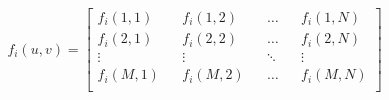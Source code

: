 \documentclass[../main.tex]{subfiles}%
\begin{document}
%
    \Xequation%
    \begin{equation}%
        f_{i}(u,v) =%
        \begin{bmatrix}%
            f_{i}(1,1) && f_{i}(1,2) && \dots && f_{i}(1,N) \\%
            f_{i}(2,1) && f_{i}(2,2) && \dots && f_{i}(2,N) \\%
            \vdots && \vdots && \ddots && \vdots \\%
            f_{i}(M,1) && f_{i}(M,2) && \dots && f_{i}(M,N) \\%
        \end{bmatrix}%
        \label{eq:super-sampling-single-channel}%
    \end{equation}%
\end{document}
